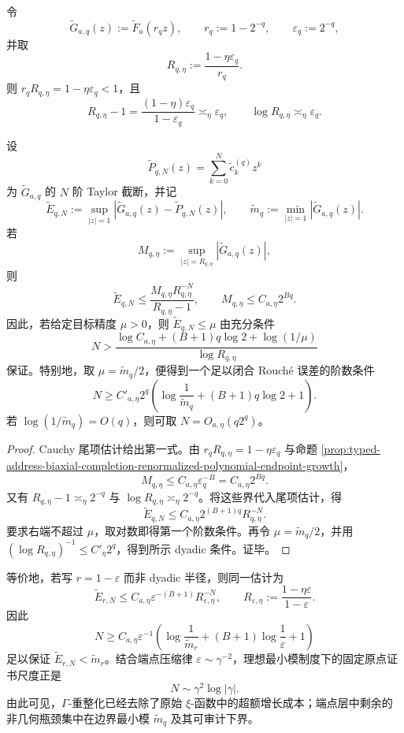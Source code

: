 令
\[
\widetilde G_{a,q}(z):=\widetilde F_a(r_qz),
\qquad
r_q:=1-2^{-q},
\qquad
\varepsilon_q:=2^{-q},
\]
并取
\[
R_{q,\eta}:=\frac{1-\eta\varepsilon_q}{r_q}.
\]
则 \(r_qR_{q,\eta}=1-\eta\varepsilon_q<1\)，且
\[
R_{q,\eta}-1
=
\frac{(1-\eta)\varepsilon_q}{1-\varepsilon_q}
\asymp_{\eta}\varepsilon_q,
\qquad
\log R_{q,\eta}\asymp_{\eta}\varepsilon_q.
\]

\begin{proposition}\label{prop:typed-address-biaxial-completion-renormalized-taylor-tail-budget}
设
\[
\widetilde P_{q,N}(z)=\sum_{k=0}^{N}\widetilde c_k^{(q)}z^k
\]
为 \(\widetilde G_{a,q}\) 的 \(N\) 阶 Taylor 截断，并记
\[
\widetilde E_{q,N}:=
\sup_{|z|=1}|\widetilde G_{a,q}(z)-\widetilde P_{q,N}(z)|,
\qquad
\widetilde m_q:=\min_{|z|=1}|\widetilde G_{a,q}(z)|.
\]
若
\[
M_{q,\eta}:=
\sup_{|z|=R_{q,\eta}}|\widetilde G_{a,q}(z)|,
\]
则
\[
\widetilde E_{q,N}
\le
\frac{M_{q,\eta}R_{q,\eta}^{-N}}{R_{q,\eta}-1},
\qquad
M_{q,\eta}\le C_{a,\eta}2^{Bq}.
\]
因此，若给定目标精度 \(\mu>0\)，则 \(\widetilde E_{q,N}\le\mu\) 由充分条件
\[
N>
\frac{
\log C_{a,\eta}
+(B+1)q\log2
+\log(1/\mu)
}{
\log R_{q,\eta}
}
\]
保证。特别地，取 \(\mu=\widetilde m_q/2\)，便得到一个足以闭合 Rouch\'e 误差的阶数条件
\[
N
\ge
C'_{a,\eta}2^q
\left(
\log\frac1{\widetilde m_q}
+(B+1)q\log2
+1
\right).
\]
若 \(\log(1/\widetilde m_q)=O(q)\)，则可取 \(N=O_{a,\eta}(q2^q)\)。
\end{proposition}
\begin{proof}
Cauchy 尾项估计给出第一式。由 \(r_qR_{q,\eta}=1-\eta\varepsilon_q\) 与命题 \ref{prop:typed-address-biaxial-completion-renormalized-polynomial-endpoint-growth}，
\[
M_{q,\eta}\le C_{a,\eta}\varepsilon_q^{-B}=C_{a,\eta}2^{Bq}.
\]
又有 \(R_{q,\eta}-1\asymp_{\eta}2^{-q}\) 与 \(\log R_{q,\eta}\asymp_{\eta}2^{-q}\)。将这些界代入尾项估计，得
\[
\widetilde E_{q,N}
\le
C_{a,\eta}2^{(B+1)q}R_{q,\eta}^{-N}.
\]
要求右端不超过 \(\mu\)，取对数即得第一个阶数条件。再令 \(\mu=\widetilde m_q/2\)，并用 \((\log R_{q,\eta})^{-1}\le C'_\eta2^q\)，得到所示 dyadic 条件。证毕。
\end{proof}

等价地，若写 \(r=1-\varepsilon\) 而非 dyadic 半径，则同一估计为
\[
\widetilde E_{r,N}
\le
C_{a,\eta}\varepsilon^{-(B+1)}R_{\varepsilon,\eta}^{-N},
\qquad
R_{\varepsilon,\eta}:=\frac{1-\eta\varepsilon}{1-\varepsilon}.
\]
因此
\[
N
\ge
C_{a,\eta}\varepsilon^{-1}
\left(
\log\frac1{\widetilde m_r}
+(B+1)\log\frac1\varepsilon
+1
\right)
\]
足以保证 \(\widetilde E_{r,N}<\widetilde m_r\)。结合端点压缩律 \(\varepsilon\sim\gamma^{-2}\)，理想最小模制度下的固定原点证书尺度正是
\[
N\sim \gamma^2\log|\gamma|.
\]
由此可见，\(\Gamma\)-重整化已经去除了原始 \(\xi\)-函数中的超额增长成本；端点层中剩余的非几何瓶颈集中在边界最小模 \(\widetilde m_q\) 及其可审计下界。

